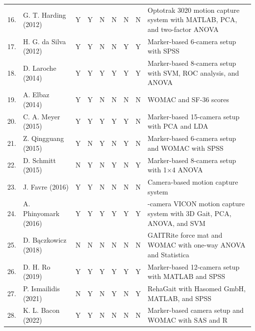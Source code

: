 \begin{longtable}{@{}r >{\raggedright\arraybackslash}p{3.55cm}
    *{6}{c} >{\raggedright\arraybackslash}p{8.55cm}@{}}
16. & G. T. Harding \cite{harding2012body} (2012) & Y & Y & N & N & N & N & Optotrak 3020 motion capture system with MATLAB, PCA, and two-factor ANOVA \\
17. & H. G. da Silva \cite{da2012biomechanical} (2012) & Y & Y & N & N & Y & Y & Marker-based 6-camera setup with SPSS \\
18. & D. Laroche \cite{laroche2014classification} (2014) & Y & Y & Y & Y & Y & Y & Marker-based 8-camera setup with SVM, ROC analysis, and ANOVA \\
19. & A. Elbaz \cite{elbaz2014novel} (2014) & Y & Y & N & N & N & N & WOMAC and SF-36 scores \\
20. & C. A. Meyer \cite{meyer2015biomechanical} (2015) & Y & Y & Y & Y & Y & N & Marker-based 15-camera setup with PCA and LDA \\
21. & Z. Qingguang \cite{qingguang2015gait} (2015) & Y & N & Y & N & Y & N & Marker-based 6-camera setup and WOMAC with SPSS \\
22. & D. Schmitt \cite{schmitt2015effect} (2015) & N & Y & N & Y & N & Y & Marker-based 8-camera setup with 1$\times$4 ANOVA \\
23. & J. Favre \cite{favre2016gait} (2016) & Y & Y & N & N & N & N & Camera-based motion capture system \\
24. & A. Phinyomark \cite{phinyomark2016gender} (2016) & Y & Y & Y & Y & Y & Y & 8-camera VICON motion capture system with 3D Gait, PCA, ANOVA, and SVM \\
25. & D. B{\k{a}}czkowicz \cite{bkaczkowicz2018gait} (2018) & N & N & N & N & N & N & GAITRite force mat and WOMAC with one-way ANOVA and Statistica \\
26. & D. H. Ro \cite{ro2019effects} (2019) & Y & Y & Y & Y & Y & Y & Marker-based 12-camera setup with MATLAB and SPSS \\
27. & P. Ismailidis \cite{ismailidis2021kinematic} (2021) & N & Y & N & Y & N & Y & RehaGait with Hasomed GmbH, MATLAB, and SPSS \\
28. & K. L. Bacon \cite{bacon2022relation} (2022) & Y & Y & N & N & N & N & Marker-based camera setup and WOMAC with SAS and R \\
\end{longtable}
\endgroup
